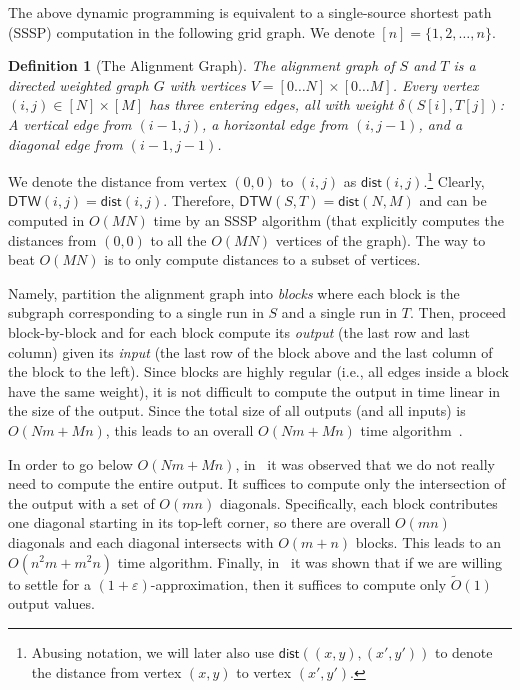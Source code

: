 \documentclass[10pt,a4paper]{article}
\newtheorem{definition}[theorem]{Definition}
\newcommand{\DTW}{\mathsf{DTW}}
\newcommand{\dist}{\mathsf{dist}}
\begin{document}
The above dynamic programming is equivalent to a single-source shortest path (SSSP) computation in the following grid graph. We denote $[n] = \{1,2,\ldots,n\}$.
\begin{definition}[The Alignment Graph]
The alignment graph of $S$ and $T$ is a directed weighted graph $G$ with vertices $V = [0\ldots N] \times [0\ldots M]$.
Every vertex $(i,j)\in [N]\times[M]$ 
has three entering edges, all with weight $\delta(S[i],T[j])$: A vertical edge from  $(i-1,j)$, a horizontal edge from  $(i,j-1)$, and a diagonal edge from $(i-1,j-1)$. 
\end{definition}

We denote the distance from vertex $(0,0)$ to $(i,j)$ as $\dist(i,j)$.\footnote{Abusing notation, we will later also use $\dist((x,y), (x',y'))$ to denote the distance from vertex $(x,y)$ to vertex $(x',y')$.} 
 Clearly, $\DTW(i,j) = \dist(i,j) $. Therefore, $\DTW(S,T)= \dist(N,M)$ and can be computed in $O(MN)$ time by an SSSP algorithm (that explicitly computes the distances from $(0,0)$ to all the $O(MN)$ vertices of the graph). The way to beat $O(MN)$ is to only compute distances to a subset of vertices. 

Namely, partition the alignment graph into {\em blocks} where each block is the subgraph corresponding to a single run in $S$ and a single run in $T$. Then, proceed block-by-block and for each block compute its {\em output} (the last row and last column) given its {\em input} (the last row of the block above and the last column of the block to the left). Since blocks are highly regular (i.e., all edges inside a block have the same weight), it is not difficult to compute the output in time linear in the size of the output. Since the total size of all outputs (and all inputs) is $O(Nm+Mn)$, this leads to an overall   $O(Nm+Mn)$ time algorithm~\cite{rle1,DBLP:journals/corr/abs-1903-03003,DBLP:conf/icalp/Kuszmaul19}. 
 
 In order to go below $O(Nm+Mn)$, in~\cite{DBLP:journals/corr/abs-1903-03003} it was observed that we do not really need to compute the entire output. It suffices to compute only the intersection of the output with a set of $O(mn)$ diagonals. Specifically, each block contributes one diagonal starting in its top-left corner, so there are overall $O(mn)$ diagonals and each diagonal intersects with $O(m+n)$ blocks. This leads to an $O(n^2m +m^2n)$ time algorithm. 
Finally, in~\cite{DBLP:conf/esa/XiK22} it was shown that if we are willing to settle for a $(1+\varepsilon)$-approximation, then it suffices to compute only $\tilde O(1)$ output values. 
\end{document}
